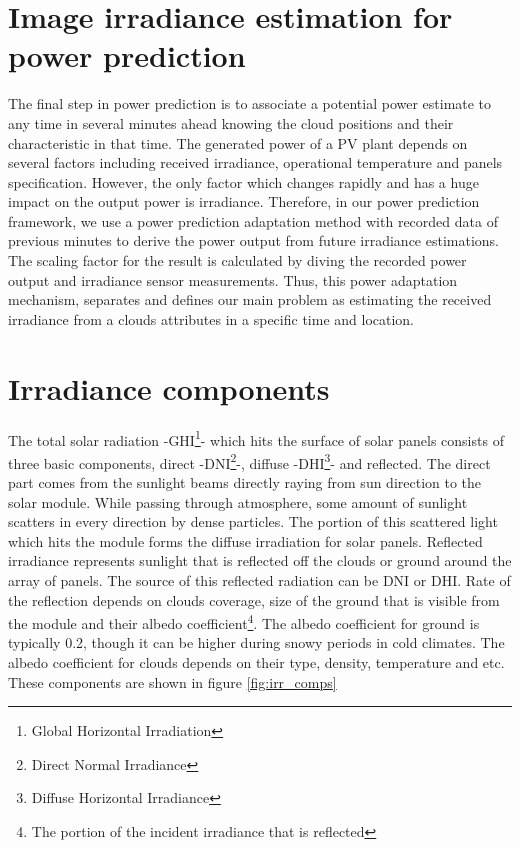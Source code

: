 \section{Image irradiance estimation for power prediction}
The final step in power prediction is to associate a potential power estimate to any time in several minutes ahead knowing the cloud positions and their characteristic in that time. The generated power of a PV plant depends on several factors including received irradiance, operational temperature and panels specification. However, the only factor which changes rapidly and has a huge impact on the output power is irradiance. Therefore, in our power prediction framework, we use a power prediction adaptation method with recorded data of previous minutes to derive the power output from future irradiance estimations. The scaling factor for the result is calculated by diving the recorded power output and irradiance sensor measurements. Thus, this power adaptation mechanism, separates and defines our main problem as estimating the received irradiance from a clouds attributes in a specific time and location.

\section{Irradiance components}
The total solar radiation -GHI\footnote{Global Horizontal Irradiation}- which hits the surface of solar panels consists of three basic components, direct -DNI\footnote{Direct Normal Irradiance}-, diffuse -DHI\footnote{Diffuse Horizontal Irradiance}- and reflected. The direct part comes from the sunlight beams directly raying from sun direction to the solar module. While passing through atmosphere, some amount of sunlight scatters in every direction by dense particles. The portion of this scattered light which hits the module forms the diffuse irradiation for solar panels. 
Reflected irradiance represents sunlight that is reflected off the clouds or ground around the array of panels. The source of this reflected radiation can be DNI or DHI. Rate of the reflection depends on clouds coverage, size of the ground that is visible from the module and their albedo coefficient\footnote{The portion of the incident irradiance that is reflected}. The albedo coefficient for ground is typically 0.2, though it can be higher during snowy periods in cold climates. The albedo coefficient for clouds depends on their type, density, temperature and etc. These components are shown in figure 	\ref{fig:irr_comps}

